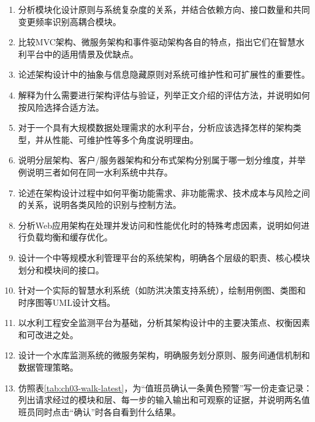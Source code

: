 \begin{enumerate}
\item 分析模块化设计原则与系统复杂度的关系，并结合依赖方向、接口数量和共同变更频率识别高耦合模块。
\item 比较MVC架构、微服务架构和事件驱动架构各自的特点，指出它们在智慧水利平台中的适用情景及优缺点。
\item 论述架构设计中的抽象与信息隐藏原则对系统可维护性和可扩展性的重要性。
\item 解释为什么需要进行架构评估与验证，列举正文介绍的评估方法，并说明如何按风险选择合适方法。
\item 对于一个具有大规模数据处理需求的水利平台，分析应该选择怎样的架构类型，并从性能、可维护性等多个角度说明理由。
\item 说明分层架构、客户/服务器架构和分布式架构分别属于哪一划分维度，并举例说明三者如何在同一水利系统中共存。
\item 论述在架构设计过程中如何平衡功能需求、非功能需求、技术成本与风险之间的关系，说明各类风险的识别与控制方法。
\item 分析Web应用架构在处理并发访问和性能优化时的特殊考虑因素，说明如何进行负载均衡和缓存优化。
\item 设计一个中等规模水利管理平台的系统架构，明确各个层级的职责、核心模块划分和模块间的接口。
\item 针对一个实际的智慧水利系统（如防洪决策支持系统），绘制用例图、类图和时序图等UML设计文档。
\item 以水利工程安全监测平台为基础，分析其架构设计中的主要决策点、权衡因素和可改进之处。
\item 设计一个水库监测系统的微服务架构，明确服务划分原则、服务间通信机制和数据管理策略。
\item 仿照表\ref{tab:ch03-walk-latest}，为“值班员确认一条黄色预警”写一份走查记录：列出请求经过的模块和层、每一步的输入输出和可观察的证据，并说明两名值班员同时点击“确认”时各自看到什么结果。
\end{enumerate}
